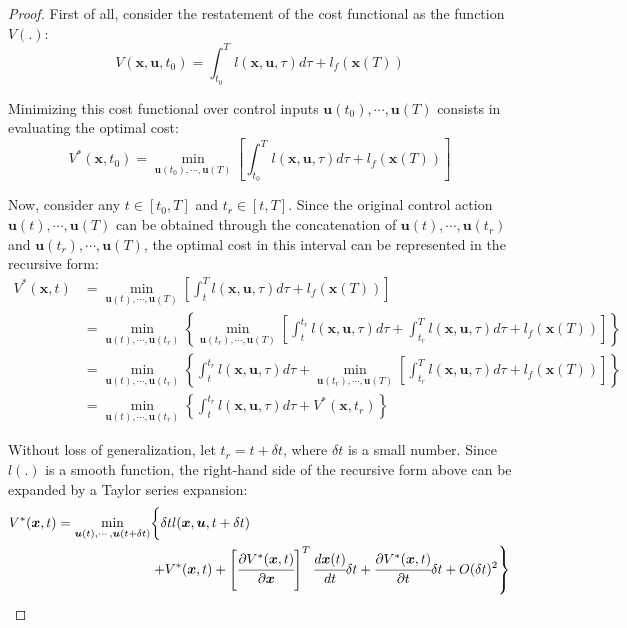 \documentclass[a4paper,11pt]{book}
\numberwithin{figure}{chapter}
\numberwithin{equation}{chapter}
\numberwithin{table}{chapter}
\theoremstyle{definition}
\begin{document}
\begin{proof}
	First of all, consider the restatement of the cost functional as the function $V(.)$:
	\begin{equation}
		V(\bm{x}, \bm{u}, t_0) = \int_{t_0}^T l(\bm{x}, \bm{u}, \tau) d \tau + l_f(\bm{x}(T))
	\end{equation}
	
	Minimizing this cost functional over control inputs $\bm{u}(t_0), \cdots, \bm{u}(T)$ consists in evaluating the optimal cost:
	\begin{equation}
		V^*(\bm{x}, t_0) = \min_{\bm{u}(t_0), \cdots, \bm{u}(T)} \left[ \int_{t_0}^T l(\bm{x}, \bm{u}, \tau) d \tau + l_f(\bm{x}(T)) \right]
	\end{equation}
	
	Now, consider any $t \in [t_0, T]$ and $t_r \in [t, T]$. Since the original control action $\bm{u}(t), \cdots, \bm{u}(T)$ can be obtained through the concatenation of $\bm{u}(t), \cdots, \bm{u}(t_r)$ and $\bm{u}(t_r), \cdots, \bm{u}(T)$, the optimal cost in this interval can be represented in the recursive form:
	\begin{equation} \label{eq:HJERecursive}
	\begin{split}
	V^*(\bm{x}, t) &= \min_{\bm{u}(t), \cdots, \bm{u}(T)} \left[ \int_{t}^T l(\bm{x}, \bm{u}, \tau) d \tau + l_f(\bm{x}(T)) \right] \\
		&= \min_{\bm{u}(t), \cdots, \bm{u}(t_r)} \left\{ \min_{\bm{u}(t_r), \cdots, \bm{u}(T)} \left[ \int_{t}^{t_r} l(\bm{x}, \bm{u}, \tau) d \tau + \int_{t_r}^{T} l(\bm{x}, \bm{u}, \tau) d \tau + l_f(\bm{x}(T)) \right] \right\} \\
		&= \min_{\bm{u}(t), \cdots, \bm{u}(t_r)} \left\{ \int_{t}^{t_r} l(\bm{x}, \bm{u}, \tau) d \tau + \min_{\bm{u}(t_r), \cdots, \bm{u}(T)} \left[ \int_{t_r}^{T} l(\bm{x}, \bm{u}, \tau) d \tau + l_f(\bm{x}(T)) \right] \right\} \\
		&= \min_{\bm{u}(t), \cdots, \bm{u}(t_r)} \left\{ \int_{t}^{t_r} l(\bm{x}, \bm{u}, \tau) d \tau + V^*(\bm{x}, t_r) \right\}
	\end{split}
	\end{equation}
	
	Without loss of generalization, let $t_r = t + \delta t$, where $\delta t$ is a small number. Since $l(.)$ is a smooth function, the right-hand side of the recursive form above can be expanded by a Taylor series expansion:
	\begin{equation}
	\begin{split}
		V^*(\bm{x}, t) = \min_{\bm{u}(t), \cdots, \bm{u}(t+\delta t)} & \biggl\{ \delta t l(\bm{x}, \bm{u}, t + \delta t) \biggr. \\ 
		& \left. + V^*(\bm{x}, t) + \left[ \cfrac{\partial V^*(\bm{x}, t)}{\partial \bm{x}} \right]^T \cfrac{d \bm{x}(t)}{dt} \delta t + \cfrac{\partial V^*(\bm{x}, t)}{\partial t} \delta t + O(\delta t)^2  \right\}
	\end{split}
	\end{equation}
	

\end{proof}
\end{document}
